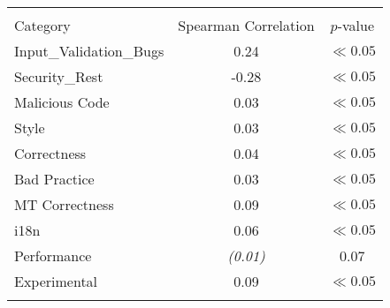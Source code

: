 
\begin{tabular}{lcc}
\hline \\
Category & Spearman Correlation & $p$-value \\ \hline 
Input_Validation_Bugs & 0.24 & $\ll 0.05$\\
Security_Rest & -0.28 & $\ll 0.05$\\
Malicious Code & 0.03 & $\ll 0.05$\\
Style & 0.03 & $\ll 0.05$\\
Correctness & 0.04 & $\ll 0.05$\\
Bad Practice & 0.03 & $\ll 0.05$\\
MT Correctness & 0.09 & $\ll 0.05$\\
i18n & 0.06 & $\ll 0.05$\\
Performance & {\it (0.01) } & 0.07\\
Experimental & 0.09 & $\ll 0.05$\\
\hline \\
\end{tabular}
